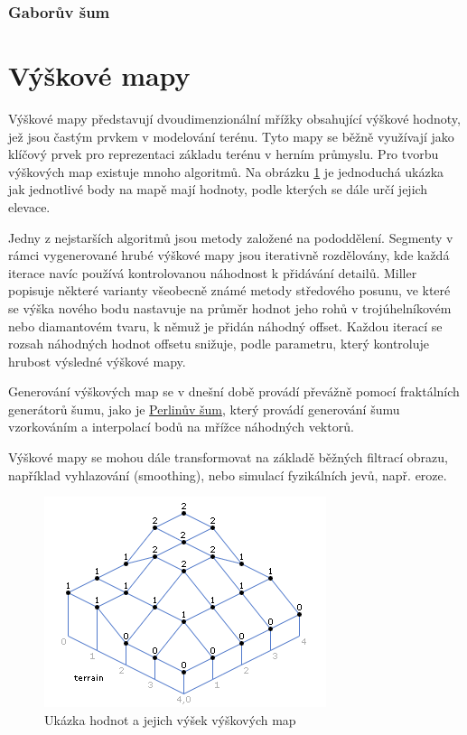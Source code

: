 \subsubsection{Gaborův šum}
\label{GaborNoise}


\section{Výškové mapy}
\label{heightMaps}
Výškové mapy představují dvoudimenzionální mřížky obsahující výškové hodnoty, jež jsou častým prvkem v modelování terénu. Tyto mapy se běžně využívají jako klíčový prvek pro reprezentaci základu terénu v herním průmyslu. Pro tvorbu výškových map existuje mnoho algoritmů. Na obrázku \ref{HeightMap} je jednoduchá ukázka jak jednotlivé body na mapě mají hodnoty, podle kterých se dále určí jejich elevace. \cite{heightMap08}

Jedny z nejstarších algoritmů jsou metody založené na pododdělení. Segmenty v rámci vygenerované hrubé výškové mapy jsou iterativně rozdělovány, kde každá iterace navíc používá kontrolovanou náhodnost k přidávání detailů. Miller \cite{MillerRendering} popisuje některé varianty všeobecně známé metody středového posunu, ve které se výška nového bodu nastavuje na průměr hodnot jeho rohů v trojúhelníkovém nebo diamantovém tvaru, k němuž je přidán náhodný offset. Každou iterací se rozsah náhodných hodnot offsetu snižuje, podle parametru, který kontroluje hrubost výsledné výškové mapy. 

Generování výškových map se v dnešní době provádí převážně pomocí fraktálních generátorů šumu, jako je \hyperref[perlinNoise]{Perlinův šum}, který provádí generování šumu vzorkováním a interpolací bodů na mřížce náhodných vektorů.

Výškové mapy se mohou dále transformovat na základě běžných filtrací obrazu, například vyhlazování (smoothing), nebo simulací fyzikálních jevů, např. eroze. \cite{inproceedings}

\begin{figure}[H]
	\centering
	\includegraphics[scale=0.9]{obrazky-figures/HeightMap.png}
	\caption{Ukázka hodnot a jejich výšek výškových map}
	\label{HeightMap}
\end{figure}

